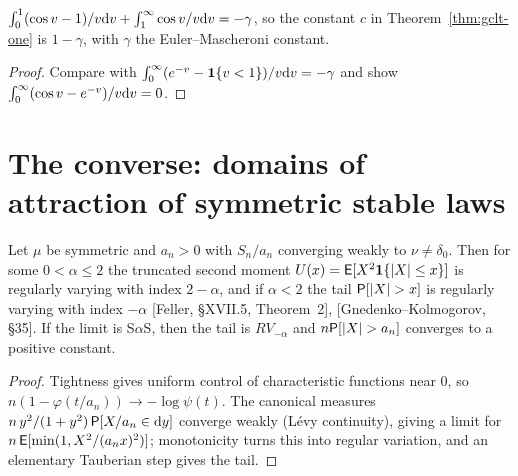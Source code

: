 \begin{corollary}[The $\alpha = 1$ constant is $1 - \gamma$]
  \label{cor:gclt-one-euler}
  \leanok
  $\int_0^1 (\cos v - 1)/v \mathrm{d} v + \int_1^\infty \cos v / v \mathrm{d} v = -\gamma$, so the constant $c$ in
  Theorem~\ref{thm:gclt-one} is $1 - \gamma$, with $\gamma$ the Euler--Mascheroni constant.
\end{corollary}
\begin{proof}
  \leanok
  Compare with $\int_0^\infty (e^{-v} - \mathbf 1\{v < 1\})/v \mathrm{d} v = -\gamma$ and show
  $\int_0^\infty (\cos v - e^{-v})/v \mathrm{d} v = 0$.
\end{proof}

\section{The converse: domains of attraction of symmetric stable laws}

\begin{theorem}
  \label{thm:gclt-converse}
  \leanok
  Let $\mu$ be symmetric and $a_n > 0$ with $S_n/a_n$ converging weakly to $\nu \ne \delta_0$. Then for some
  $0 < \alpha \le 2$ the truncated second moment $U(x) = \mathsf{E}[X^2 \mathbf 1\{|X| \le x\}]$ is regularly varying with
  index $2 - \alpha$, and if $\alpha < 2$ the tail $\mathsf{P}[|X| > x]$ is regularly varying with index $-\alpha$
  [Feller, \S XVII.5, Theorem~2], [Gnedenko--Kolmogorov, \S35]. If the limit is S$\alpha$S, then the tail is
  $RV_{-\alpha}$ and $n\mathsf{P}[|X| > a_n]$ converges to a positive constant.
\end{theorem}
\begin{proof}
  \leanok
  Tightness gives uniform control of characteristic functions near $0$, so
  $n(1 - \varphi(t/a_n)) \to -\log \psi(t)$. The canonical measures $n\,y^2/(1+y^2)\,\mathsf{P}[X/a_n \in \mathrm{d} y]$ converge weakly
  (L\'evy continuity), giving a limit for $n\,\mathsf{E}[\min(1, X^2/(a_n x)^2)]$; monotonicity turns this into regular
  variation, and an elementary Tauberian step gives the tail.
\end{proof}

